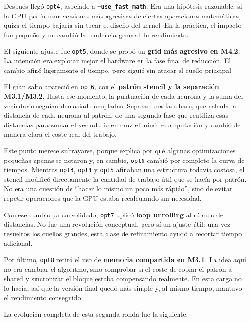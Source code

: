 \documentclass[11pt,a4paper]{article}
\begin{document}
Después llegó \texttt{opt4}, asociado a \textbf{\texttt{--use\_fast\_math}}. Era una hipótesis razonable: si la GPU podía usar versiones más agresivas de ciertas operaciones matemáticas, quizá el tiempo bajaría sin tocar el diseño del kernel. En la práctica, el impacto fue pequeño y no cambió la tendencia general de rendimiento.

El siguiente ajuste fue \texttt{opt5}, donde se probó un \textbf{grid más agresivo en M4.2}. La intención era explotar mejor el hardware en la fase final de reducción. El cambio afinó ligeramente el tiempo, pero siguió sin atacar el cuello principal.

El gran salto apareció en \texttt{opt6}, con el \textbf{patrón stencil y la separación M3.1/M3.2}. Hasta ese momento, la puntuación de cada neurona y la suma del vecindario seguían demasiado acopladas. Separar una fase base, que calcula la distancia de cada neurona al patrón, de una segunda fase que reutiliza esas distancias para sumar el vecindario en cruz eliminó recomputación y cambió de manera clara el coste real del trabajo.

Este punto merece subrayarse, porque explica por qué algunas optimizaciones pequeñas apenas se notaron y, en cambio, \texttt{opt6} cambió por completo la curva de tiempos. Mientras \texttt{opt3}, \texttt{opt4} y \texttt{opt5} afinaban una estructura todavía costosa, el stencil modificó directamente la cantidad de trabajo útil que se hacía por patrón. No era una cuestión de ``hacer lo mismo un poco más rápido'', sino de evitar repetir operaciones que la GPU estaba recalculando sin necesidad.

Con ese cambio ya consolidado, \texttt{opt7} aplicó \textbf{loop unrolling} al cálculo de distancias. No fue una revolución conceptual, pero sí un ajuste útil: una vez resueltos los cuellos grandes, esta clase de refinamiento ayudó a recortar tiempo adicional.

Por último, \texttt{opt8} retiró el uso de \textbf{memoria compartida en M3.1}. La idea aquí no era cambiar el algoritmo, sino comprobar si el coste de copiar el patrón a shared y sincronizar el bloque estaba compensando realmente. En esta carga no lo hacía, así que la versión final quedó más simple y, al mismo tiempo, mantuvo el rendimiento conseguido.

La evolución completa de esta segunda ronda fue la siguiente:
\end{document}
